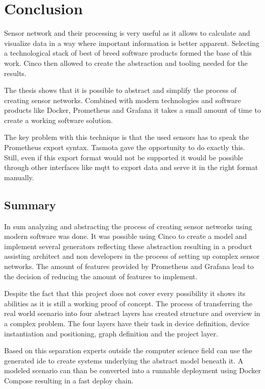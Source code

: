\chapter{Conclusion}
\label{chapter:fazit}
Sensor network and their processing is very useful as it allows to calculate and visualize data in a way where important information is better apparent. Selecting a technological stack of best of breed software products formed the base of this work. Cinco then allowed to create the abstraction and tooling needed for the results.

The thesis shows that it is possible to abstract and simplify the process of creating sensor networks. Combined with modern technologies and software products like Docker, Prometheus and Grafana it takes a small amount of time to create a working software solution. 

The key problem with this technique is that the used sensors has to speak the Prometheus export syntax. Tasmota gave the opportunity to do exactly this. Still, even if this export format would not be supported it would be possible through other interfaces like \gls{mqtt} to export data and serve it in the right format manually. 

\section{Summary}
In sum analyzing and abstracting the process of creating sensor networks using modern software was done. It was possible using Cinco to create a model and implement several generators reflecting these abstraction resulting in a product assisting architect and non developers in the process of setting up complex sensor networks. The amount of features provided by Prometheus and Grafana lead to the decision of reducing the amount of features to implement. 

Despite the fact that this project does not cover every possibility it shows its abilities as it is still a working proof of concept. The process of transferring the real world scenario into four abstract layers has created structure and overview in a complex problem. The four layers have their task in device definition, device instantiation and positioning, graph definition and the project layer. 

Based on this separation experts outside the computer science field can use the generated \gls{ide} to create systems underlying the abstract model beneath it. A modeled scenario can than be converted into a runnable deployment using Docker Compose resulting in a fast deploy chain.

